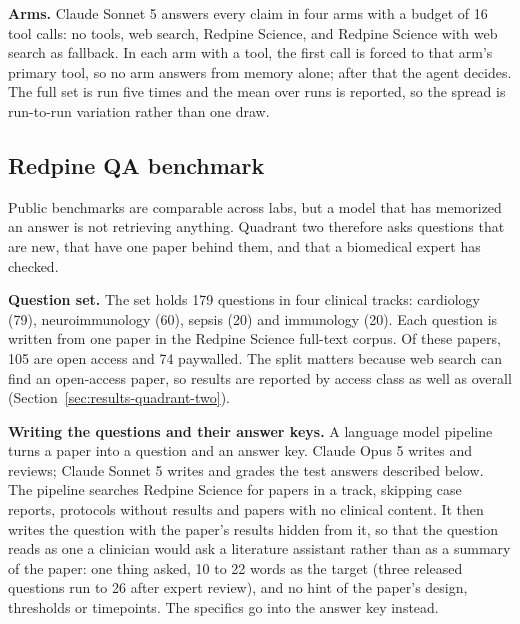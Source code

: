 \documentclass[sn-mathphys,Numbered]{sn-jnl}%
\newcommand{\lead}[1]{\textbf{#1}}   %
\begin{document}
\lead{Arms.} Claude Sonnet 5 answers every claim in four arms with a budget of 16 tool
calls: no tools, web search, Redpine Science, and Redpine Science with web search as
fallback. In each arm with a tool, the first call is forced to that arm's primary tool,
so no arm answers from memory alone; after that the agent decides. The full set is run
five times and the mean over runs is reported, so the spread is run-to-run variation
rather than one draw.

\subsection{Redpine QA benchmark}\label{sec:method-quadrant-two}

Public benchmarks are comparable across labs, but a model that has memorized an answer
is not retrieving anything. Quadrant two therefore asks questions that are new, that
have one paper behind them, and that a biomedical expert has checked.

\lead{Question set.} The set holds 179 questions in four clinical tracks: cardiology
(79), neuroimmunology (60), sepsis (20) and immunology (20). Each question is written
from one paper in the Redpine Science full-text corpus. Of these papers, 105 are open
access and 74 paywalled. The split matters because web search can find an open-access
paper, so results are reported by access class as well as overall
(Section~\ref{sec:results-quadrant-two}).

\lead{Writing the questions and their answer keys.} A language model pipeline turns a
paper into a question and an answer key. Claude Opus 5 writes and reviews; Claude
Sonnet 5 writes and grades the test answers described below. The pipeline searches
Redpine Science for papers in a track, skipping case reports, protocols without results
and papers with no clinical content. It then writes the question with the paper's
results hidden from it, so that the question reads as one a clinician would ask a
literature assistant rather than as a summary of the paper: one thing asked, 10 to 22
words as the target (three released questions run to 26 after expert review), and no
hint of the paper's design, thresholds or timepoints. The specifics go into
the answer key instead.
\end{document}
